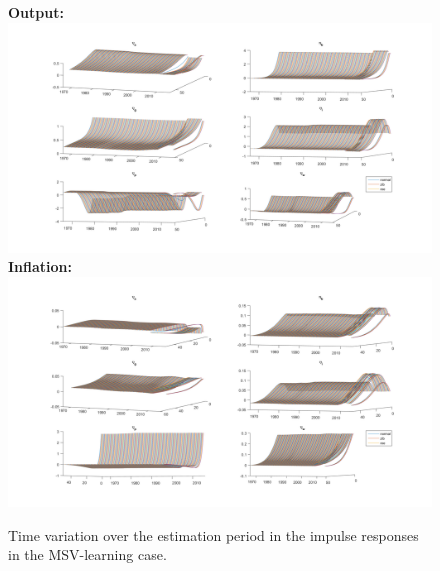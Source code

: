 \documentclass[12pt,reqno]{article}
\numberwithin{equation}{section}
\begin{document}

\begin{figure}[H]
\caption{Time variation over the estimation period in the impulse responses in the MSV-learning case. }
\label{irf_msv_2_3d}
\textbf{Output:}\\
\includegraphics[scale=0.5]{MSV_impresp_output_3d.pdf}
\textbf{Inflation:}\\
\includegraphics[scale=0.5]{MSV_impresp_pinf_3d.pdf}

\end{figure}
\end{document}
